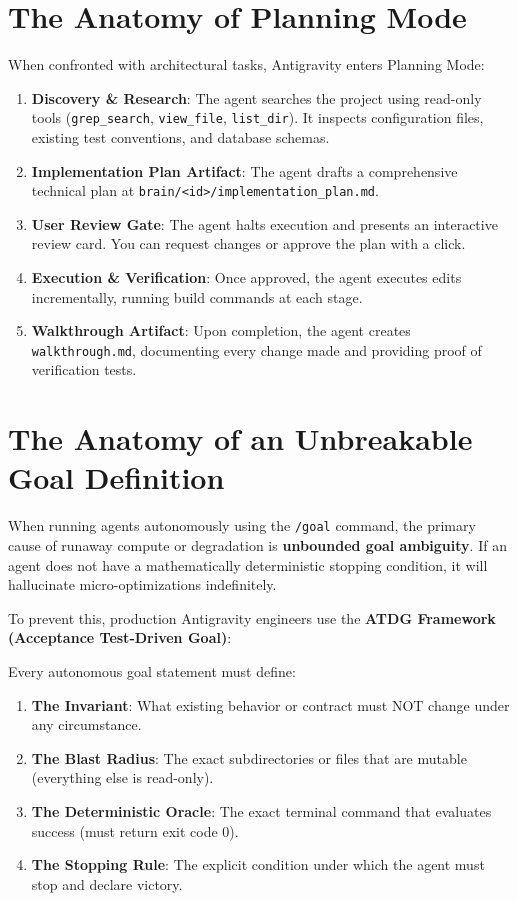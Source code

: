 \documentclass[11pt,a4paper,oneside]{book}
\begin{document}
\section{The Anatomy of Planning Mode}
When confronted with architectural tasks, Antigravity enters Planning Mode:
\begin{enumerate}
    \item \textbf{Discovery \& Research}: The agent searches the project using read-only tools (\texttt{grep\_search}, \texttt{view\_file}, \texttt{list\_dir}). It inspects configuration files, existing test conventions, and database schemas.
    \item \textbf{Implementation Plan Artifact}: The agent drafts a comprehensive technical plan at \texttt{brain/<id>/implementation\_plan.md}.
    \item \textbf{User Review Gate}: The agent halts execution and presents an interactive review card. You can request changes or approve the plan with a click.
    \item \textbf{Execution \& Verification}: Once approved, the agent executes edits incrementally, running build commands at each stage.
    \item \textbf{Walkthrough Artifact}: Upon completion, the agent creates \texttt{walkthrough.md}, documenting every change made and providing proof of verification tests.
\end{enumerate}

\section{The Anatomy of an Unbreakable Goal Definition}
When running agents autonomously using the \texttt{/goal} command, the primary cause of runaway compute or degradation is \textbf{unbounded goal ambiguity}. If an agent does not have a mathematically deterministic stopping condition, it will hallucinate micro-optimizations indefinitely.

To prevent this, production Antigravity engineers use the \textbf{ATDG Framework (Acceptance Test-Driven Goal)}:

\begin{conceptbox}
Every autonomous goal statement must define:
\begin{enumerate}
    \item \textbf{The Invariant}: What existing behavior or contract must NOT change under any circumstance.
    \item \textbf{The Blast Radius}: The exact subdirectories or files that are mutable (everything else is read-only).
    \item \textbf{The Deterministic Oracle}: The exact terminal command that evaluates success (must return exit code 0).
    \item \textbf{The Stopping Rule}: The explicit condition under which the agent must stop and declare victory.
\end{enumerate}
\end{conceptbox}
\end{document}

